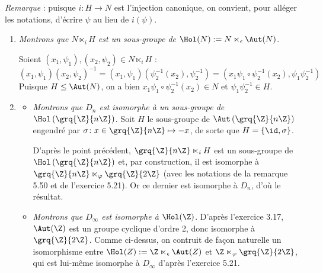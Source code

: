 \emph{Remarque} : puisque $i\colon H\to N$ est l'injection canonique, on convient, pour alléger les notations, d'écrire $\psi$ au lieu de $i(\psi)$.

\begin{enumerate}
 \item \emph{Montrons que $N\ltimes_i H$ est un sous-groupe de $\Hol(N):= N \ltimes_{\epsilon} \Aut(N)$}.

 Soient $(x_1,\psi_1), (x_2,\psi_2) \in N\ltimes_i H$ :
 \[ (x_1,\psi_1)(x_2,\psi_2)^{-1} =   (x_1,\psi_1)(\psi_2^{-1}(x_2),\psi_2^{-1}) = (x_1 \psi_1\circ \psi_2^{-1}(x_2), \psi_1\psi_2^{-1})\]
 Puisque $H\leq \Aut(N)$, on a bien $x_1 \psi_1\circ \psi_2^{-1}(x_2) \in N$ et $\psi_1\psi_2^{-1}\in H$.

 \item
 \begin{itemize}\itemsep 0.1cm
  \item  \emph{Montrons que $D_n$ est isomorphe à un sous-groupe de $\Hol\left(\grq{\Z}{n\Z} \right)$}. Soit $H$ le sous-groupe de $\Aut\left(\grq{\Z}{n\Z} \right)$ engendré par $\sigma\colon x\in \grq{\Z}{n\Z}\mapsto -x$, de sorte que $H=\{\id, \sigma \}$.

 D'après le point précédent, $\grq{\Z}{n\Z}\ltimes_i H$ est un sous-groupe de $\Hol\left(\grq{\Z}{n\Z} \right)$ et, par construction, il est isomorphe à $\grq{\Z}{n\Z}\ltimes_{\varphi} \grq{\Z}{2\Z}$ (avec les notations de la remarque 5.50 et de l'exercice 5.21). Or ce dernier est isomorphe à $D_n$, d'où le résultat.

 \item \emph{Montrons que $D_{\infty}$ est isomorphe à $\Hol(\Z)$}. D'après l'exercice 3.17, $\Aut(\Z)$ est un groupe cyclique d'ordre 2, donc isomorphe à $\grq{\Z}{2\Z}$. Comme ci-dessus, on contruit de façon naturelle un isomorphisme entre $\Hol(Z):= \Z \ltimes_{\epsilon} \Aut(Z)$ et $\Z \ltimes_{\varphi} \grq{\Z}{2\Z}$, qui est lui-même isomorphe à $D_{\infty}$ d'après l'exercice 5.21.
 \end{itemize}


\end{enumerate}



